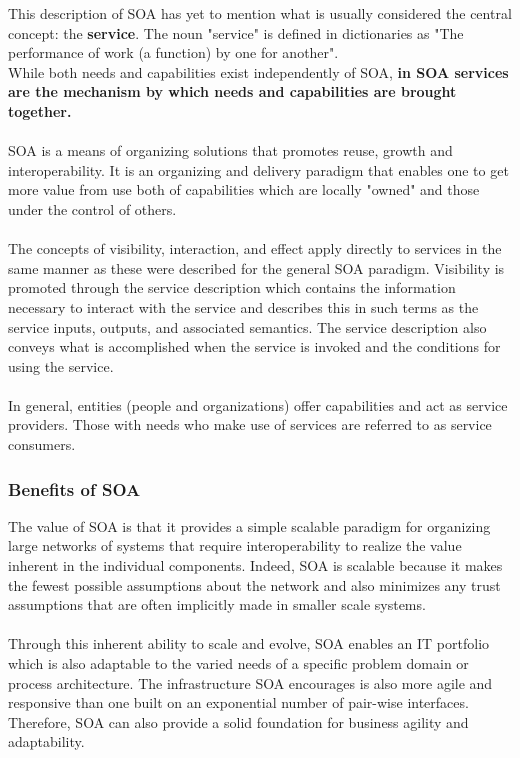 \documentclass[10pt,a4paper]{article}
\begin{document}
This description of SOA has yet to mention what is usually considered the central concept: the \textbf{service}. The noun "service" is defined in dictionaries as "The performance of work (a function) by one for another". \\
While both needs and capabilities exist independently of SOA, \textbf{in SOA services are the mechanism by which needs and capabilities are brought together.} \\ \\ SOA is a means of organizing solutions that promotes reuse, growth and interoperability. It is an organizing and delivery paradigm that enables one to get more value from use both of capabilities which are locally "owned" and those under the control of others. \\ \\
The concepts of visibility, interaction, and effect apply directly to services in the same manner as these were described for the general SOA paradigm. Visibility is promoted through the service description which contains the information necessary to interact with the service and describes this in such terms as the service inputs, outputs, and associated semantics. The service description also conveys what is accomplished when the service is invoked and the conditions for using the service. \\ \\ In general, entities (people and organizations) offer capabilities and act as service providers. Those with needs who make use of services are referred to as service consumers. 
\subsubsection{Benefits of SOA}
The value of SOA is that it provides a simple scalable paradigm for organizing large networks of systems that require interoperability to realize the value inherent in the individual components. Indeed, SOA is scalable because it makes the fewest possible assumptions about the network and also minimizes any trust assumptions that are often implicitly made in smaller scale systems. \\ \\ Through this inherent ability to scale and evolve, SOA enables an IT portfolio which is also adaptable to the varied needs of a specific problem domain or process architecture. The infrastructure SOA encourages is also more agile and responsive than one built on an exponential number of pair-wise interfaces. Therefore, SOA can also provide a solid foundation for business agility and adaptability.
\end{document}
